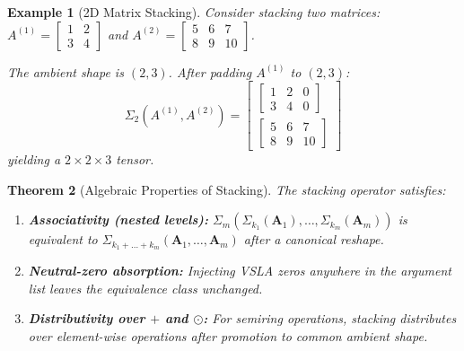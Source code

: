 \documentclass[11pt]{article}
\newtheorem{theorem}{Theorem}[section]
\newtheorem{example}[theorem]{Example}
\begin{document}
\begin{example}[2D Matrix Stacking]
Consider stacking two matrices: $A^{(1)} = \begin{bmatrix} 1 & 2 \\ 3 & 4 \end{bmatrix}$ and $A^{(2)} = \begin{bmatrix} 5 & 6 & 7 \\ 8 & 9 & 10 \end{bmatrix}$.

The ambient shape is $(2, 3)$. After padding $A^{(1)}$ to $(2, 3)$:
\[
\Sigma_2(A^{(1)}, A^{(2)}) = \begin{bmatrix}
\begin{bmatrix} 1 & 2 & 0 \\ 3 & 4 & 0 \end{bmatrix} \\[0.5em]
\begin{bmatrix} 5 & 6 & 7 \\ 8 & 9 & 10 \end{bmatrix}
\end{bmatrix}
\]
yielding a $2 \times 2 \times 3$ tensor.
\end{example}

\begin{theorem}[Algebraic Properties of Stacking]
\label{thm:stacking-properties}
The stacking operator satisfies:
\begin{enumerate}
\item \textbf{Associativity (nested levels):} $\Sigma_m(\Sigma_{k_1}(\mathbf{A}_1), \dots, \Sigma_{k_m}(\mathbf{A}_m))$ is equivalent to $\Sigma_{k_1+\dots+k_m}(\mathbf{A}_1, \dots, \mathbf{A}_m)$ after a canonical reshape.
\item \textbf{Neutral-zero absorption:} Injecting VSLA zeros anywhere in the argument list leaves the equivalence class unchanged.
\item \textbf{Distributivity over $+$ and $\odot$:} For semiring operations, stacking distributes over element-wise operations after promotion to common ambient shape.
\end{enumerate}
\end{theorem}
\end{document}
